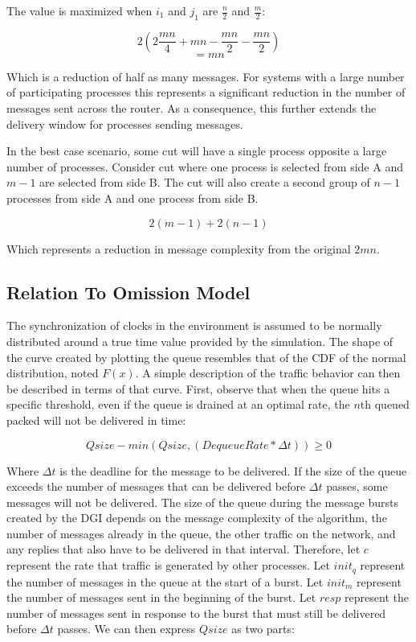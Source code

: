 The value is maximized when $i_1$ and $j_1$ are $\frac{n}{2}$ and $\frac{m}{2}$:

\begin{equation}
2( 2 \frac{mn}{4} + mn - \frac{mn}{2} - \frac{mn}{2})
\end{equation}
\begin{equation}
= mn
\end{equation}

Which is a reduction of half as many messages.
For systems with a large number of participating processes this represents a significant reduction in the number of messages sent across the router.
As a consequence, this further extends the delivery window for processes sending messages.

In the best case scenario, some cut will have a single process opposite a large number of processes.
Consider cut where one process is selected from side A and $m-1$ are selected from side B.
The cut will also create a second group of $n-1$ processes from side A and one process from side B.

\begin{equation}
2(m-1) + 2(n-1)
\end{equation}

Which represents a reduction in message complexity from the original $2mn$.

\subsection{Relation To Omission Model}

The synchronization of clocks in the environment is assumed to be normally distributed around a true time value provided by the simulation.
The shape of the curve created by plotting the queue resembles that of the \ac{CDF} of the normal distribution, noted $F(x)$.
A simple description of the traffic behavior can then be described in terms of that curve.
First, observe that when the queue hits a specific threshold, even if the queue is drained at an optimal rate, the $n$th queued packed will not be delivered in time:

\begin{equation}
Qsize - min(Qsize, (DequeueRate * \Delta t)) \geq 0
\label{eq:origin}
\end{equation}

Where $\Delta t$ is the deadline for the message to be delivered.
If the size of the queue exceeds the number of messages that can be delivered before $\Delta t$ passes, some messages will not be delivered.
The size of the queue during the message bursts created by the DGI depends on the message complexity of the algorithm, the number of messages already in the queue, the other traffic on the network, and any replies that also have to be delivered in that interval.
Therefore, let $c$ represent the rate that traffic is generated by other processes.
Let $init_q$ represent the number of messages in the queue at the start of a burst. 
Let $init_m$ represent the number of messages sent in the beginning of the burst.
Let $resp$ represent the number of messages sent in response to the burst that must still be delivered before $\Delta t$ passes.
We can then express $Qsize$ as two parts:

